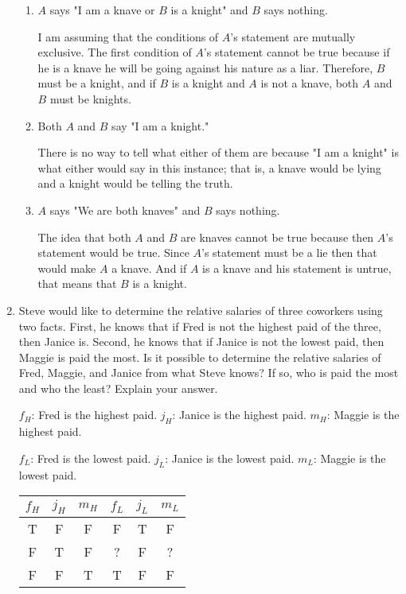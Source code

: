 \documentclass[11pt]{article}
\begin{document}
\begin{enumerate}[label=\textbf{\arabic*.}]
\begin{enumerate}[label=\textbf{\alph*)}]
		\item $A$ says "I am a knave or $B$ is a knight" and $B$ says nothing.
		
		I am assuming that the conditions of $A$'s statement are mutually exclusive. The first condition of $A$'s statement cannot be true because if he is a knave he will be going against his nature as a liar. Therefore, $B$ must be a knight, and if $B$ is a knight and $A$ is not a knave, both $A$ and $B$ must be knights.
		
		\item Both $A$ and $B$ say "I am a knight."
		
		There is no way to tell what either of them are because "I am a knight" is what either would say in this instance; that is, a knave would be lying and a knight would be telling the truth.
		
		\item $A$ says "We are both knaves" and $B$ says nothing.
		
		The idea that both $A$ and $B$ are knaves cannot be true because then $A$'s statement would be true. Since $A$'s statement must be a lie then that would make $A$ a knave. And if $A$ is a knave and his statement is untrue, that means that $B$ is a knight.
	\end{enumerate}
	
	\item Steve would like to determine the relative salaries of three coworkers using two facts. First, he knows that if Fred is not the highest paid of the three, then Janice is. Second, he knows that if Janice is not the lowest paid, then Maggie is paid the most. Is it possible to determine the relative salaries of Fred, Maggie, and Janice from what Steve knows? If so, who is paid the most and who the least? Explain your answer.
	
	\hspace{1em}$f_H$: Fred is the highest paid.
	\hspace{1em}$j_H$: Janice is the highest paid.
	\hspace{1em}$m_H$: Maggie is the highest paid. 
	
	\hspace{1.2em}$f_L$: Fred is the lowest paid.
	\hspace{1.6em}$j_L$: Janice is the lowest paid.
	\hspace{1.6em}$m_L$: Maggie is the lowest paid.
	
	\vspace{0.5em}
	\begin{tabular}{c | c | c | c | c | c}
		$f_H$ & $j_H$ & $m_H$ & $f_L$ & $j_L$ & $m_L$ \\
		\hline
		T & F & F & F & T & F \\
		F & T & F & ? & F & ? \\
		F & F & T & T & F & F \\
	\end{tabular}


\end{enumerate}
\end{document}
